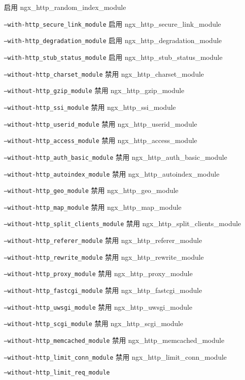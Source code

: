 \begin{compactitem}
启用 ngx\_http\_random\_index\_module
\item \texttt{--with-http\_secure\_link\_module}
启用 ngx\_http\_secure\_link\_module
\item \texttt{--with-http\_degradation\_module}
启用 ngx\_http\_degradation\_module
\item \texttt{--with-http\_stub\_status\_module}
启用 ngx\_http\_stub\_status\_module
\item \texttt{--without-http\_charset\_module}
禁用 ngx\_http\_charset\_module
\item \texttt{--without-http\_gzip\_module}
禁用 ngx\_http\_gzip\_module
\item \texttt{--without-http\_ssi\_module}
禁用 ngx\_http\_ssi\_module
\item \texttt{--without-http\_userid\_module}
禁用 ngx\_http\_userid\_module
\item \texttt{--without-http\_access\_module}
禁用 ngx\_http\_access\_module
\item \texttt{--without-http\_auth\_basic\_module}
禁用 ngx\_http\_auth\_basic\_module
\item \texttt{--without-http\_autoindex\_module}
禁用 ngx\_http\_autoindex\_module
\item \texttt{--without-http\_geo\_module}
禁用 ngx\_http\_geo\_module
\item \texttt{--without-http\_map\_module}
禁用 ngx\_http\_map\_module
\item \texttt{--without-http\_split\_clients\_module}
禁用 ngx\_http\_split\_clients\_module
\item \texttt{--without-http\_referer\_module}
禁用 ngx\_http\_referer\_module
\item \texttt{--without-http\_rewrite\_module}
禁用 ngx\_http\_rewrite\_module
\item \texttt{--without-http\_proxy\_module}
禁用 ngx\_http\_proxy\_module
\item \texttt{--without-http\_fastcgi\_module}
禁用 ngx\_http\_fastcgi\_module
\item \texttt{--without-http\_uwsgi\_module}
禁用 ngx\_http\_uwsgi\_module
\item \texttt{--without-http\_scgi\_module}
禁用 ngx\_http\_scgi\_module
\item \texttt{--without-http\_memcached\_module}
禁用 ngx\_http\_memcached\_module
\item \texttt{--without-http\_limit\_conn\_module}
禁用 ngx\_http\_limit\_conn\_module
\item \texttt{--without-http\_limit\_req\_module}

\end{compactitem}
